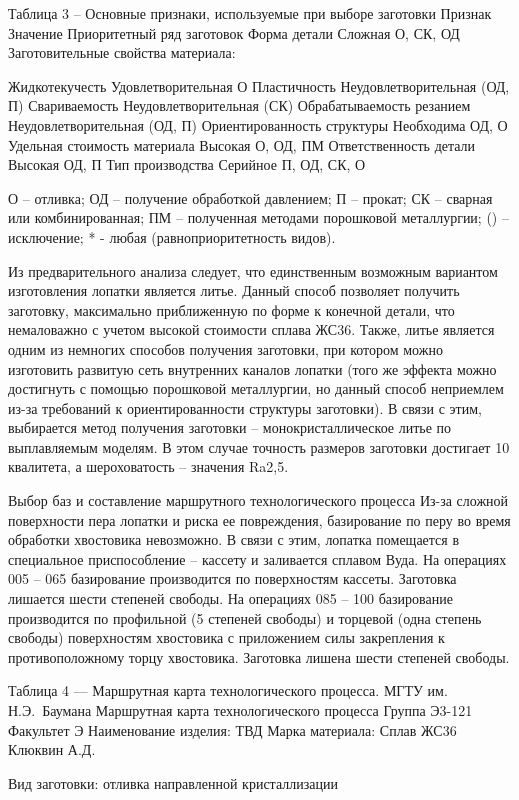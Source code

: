 Таблица 3 – Основные признаки, используемые при выборе заготовки
Признак
Значение
Приоритетный ряд заготовок
Форма детали
Сложная
О, СК, ОД
Заготовительные свойства материала:


Жидкотекучесть
Удовлетворительная
О
Пластичность
Неудовлетворительная
(ОД, П)
Свариваемость
Неудовлетворительная
(СК)
Обрабатываемость резанием
Неудовлетворительная
(ОД, П)
Ориентированность структуры
Необходима
ОД, О
Удельная стоимость материала
Высокая
О, ОД, ПМ
Ответственность детали
Высокая
ОД, П
Тип производства
Серийное
П, ОД, СК, О

О – отливка; ОД – получение обработкой давлением; П – прокат; СК – сварная или комбинированная; ПМ – полученная методами порошковой металлургии; () – исключение; * - любая (равноприоритетность видов).

Из предварительного анализа следует, что единственным возможным вариантом изготовления лопатки является литье. Данный способ позволяет получить заготовку, максимально приближенную по форме к конечной детали, что немаловажно с учетом высокой стоимости сплава ЖС36. Также, литье является одним из немногих способов получения заготовки, при котором можно изготовить развитую сеть внутренних каналов лопатки (того же эффекта можно достигнуть с помощью порошковой металлургии, но данный способ неприемлем из-за требований к ориентированности структуры заготовки).
В связи с этим, выбирается метод получения заготовки – монокристаллическое литье по выплавляемым моделям. В этом случае точность размеров заготовки достигает 10 квалитета, а шероховатость – значения Ra2,5.

Выбор баз и составление маршрутного технологического процесса
Из-за сложной поверхности пера лопатки и риска ее повреждения, базирование по перу во время обработки хвостовика невозможно. В связи с этим, лопатка помещается в специальное приспособление – кассету и заливается сплавом Вуда. На операциях 005 – 065 базирование производится по поверхностям кассеты. Заготовка лишается шести степеней свободы.
На операциях 085 – 100 базирование производится по профильной (5 степеней свободы) и торцевой (одна степень свободы) поверхностям хвостовика с приложением силы закрепления к противоположному торцу хвостовика. Заготовка лишена шести степеней свободы.

Таблица 4 — Маршрутная карта технологического процесса.
МГТУ им. Н.Э. Баумана
Маршрутная карта технологического процесса
Группа Э3-121
Факультет Э
Наименование изделия: ТВД
Марка материала: Сплав ЖС36
Клюквин А.Д.


Вид заготовки: отливка направленной кристаллизации


